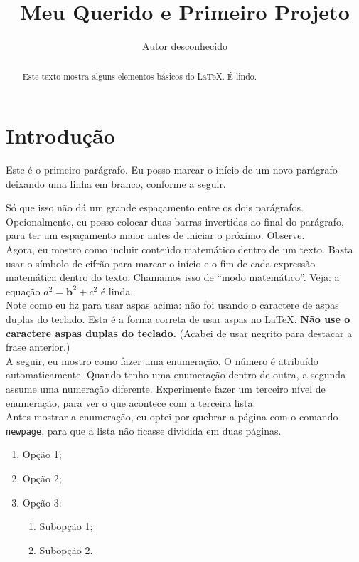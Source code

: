 \documentclass{article}
\title{Meu Querido e Primeiro Projeto}
\author{Autor desconhecido}
\begin{document}
\maketitle

\begin{abstract}
    Este texto mostra alguns elementos básicos do \LaTeX. É lindo.
\end{abstract}

\section{Introdução}

Este é o primeiro parágrafo. Eu posso marcar o início de um novo parágrafo deixando uma linha em branco, conforme a seguir.

Só que isso não dá um grande espaçamento entre os dois parágrafos. Opcionalmente, eu posso colocar duas barras invertidas ao final do parágrafo, para ter um espaçamento maior antes de iniciar o próximo. Observe.\\

Agora, eu mostro como incluir conteúdo matemático dentro de um texto. Basta usar o símbolo de cifrão para marcar o início e o fim de cada expressão matemática dentro do texto. Chamamos isso de ``modo matemático''. Veja: a equação $a^2 = \mathbf{b^2} + c^2$ é linda.\\

Note como eu fiz para usar aspas acima: não foi usando o caractere de aspas duplas do teclado. Esta é a forma correta de usar aspas no \LaTeX. \textbf{Não use o caractere aspas duplas do teclado.} (Acabei de usar negrito para destacar a frase anterior.)\\

A seguir, eu mostro como fazer uma enumeração. O número é atribuído automaticamente. Quando tenho uma enumeração dentro de outra, a segunda assume uma numeração diferente. Experimente fazer um terceiro nível de enumeração, para ver o que acontece com a terceira lista.\\

Antes mostrar a enumeração, eu optei por quebrar a página com o comando \texttt{newpage}, para que a lista não ficasse dividida em duas páginas.\\

\newpage

\begin{enumerate}
    \item Opção 1;
    \item Opção 2;
    \item Opção 3:
    \begin{enumerate}
        \item Subopção 1;
        \item Subopção 2.
    \end{enumerate}
\end{enumerate}
\end{document}

